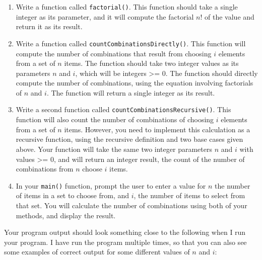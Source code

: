 \documentclass[11pt]{article}
\begin{document}
\begin{enumerate}
\item Write a function called \verb~factorial()~.  This function should take a
   single integer as its parameter, and it will compute the factorial
   $n!$ of the value and return it as its result.
\item Write a function called \verb~countCombinationsDirectly()~.  This
   function will compute the number of combinations that result from
   choosing $i$ elements from a set of $n$ items.  The function should
   take two integer values as its parameters $n$ and $i$, which will
   be integers >= 0.  The function should directly compute the number
   of combinations, using the equation involving factorials of $n$ and
   $i$.  The function will return a single integer as its result.
\item Write a second function called \verb~countCombinationsRecursive()~.
   This function will also count the number of combinations of
   choosing $i$ elements from a set of $n$ items.  However, you need
   to implement this calculation as a recursive function, using the
   recursive definition and two base cases given above.  Your function
   will take the same two integer parameters $n$ and $i$ with values
   >= 0, and will return an integer result, the count of the number of
   combinations from $n$ choose $i$ items.
\item In your \verb~main()~ function, prompt the user to enter a value for $n$
   the number of items in a set to choose from, and $i$, the number of
   items to select from that set.  You will calculate the number of
   combinations using both of your methods, and display the result.
\end{enumerate}

Your program output should look something close to the following when I
run your program.  I have run the program multiple times, so that you
can also see some examples of correct output for some different values
of $n$ and $i$:
\end{document}
